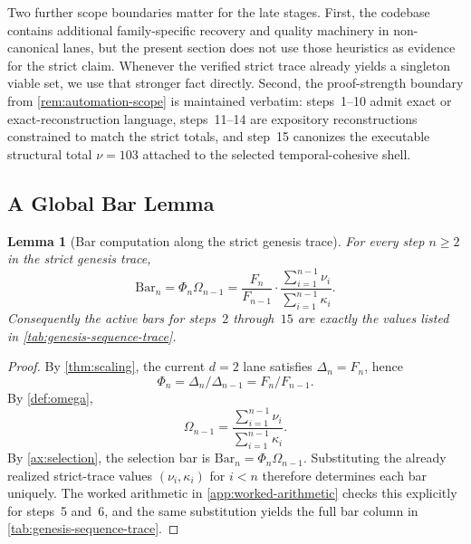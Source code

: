 \documentclass[11pt,a4paper]{article}
\theoremstyle{plain}
\newtheorem{lemma}[theorem]{Lemma}
\theoremstyle{definition}
\theoremstyle{remark}
\begin{document}
Two further scope boundaries matter for the late stages.
First, the codebase contains additional family-specific recovery and quality
machinery in non-canonical lanes, but the present section does not use those
heuristics as evidence for the strict claim.
Whenever the verified strict trace already yields a singleton viable set, we use
that stronger fact directly.
Second, the proof-strength boundary from \cref{rem:automation-scope} is
maintained verbatim:
steps~1--10 admit exact or exact-reconstruction language,
steps~11--14 are expository reconstructions constrained to match the strict
totals, and step~15 canonizes the executable structural total $\nu=103$
attached to the selected temporal-cohesive shell.

\subsection{A Global Bar Lemma}
\label{subsec:genesis-bar-lemma}

\begin{lemma}[Bar computation along the strict genesis trace]
\label{lem:genesis-bar-lemma}
For every step $n \ge 2$ in the strict genesis trace,
\[
  \mathrm{Bar}_n
  =
  \Phi_n \Omega_{n-1}
  =
  \frac{F_n}{F_{n-1}}
  \cdot
  \frac{\sum_{i=1}^{n-1}\nu_i}{\sum_{i=1}^{n-1}\kappa_i}.
\]
Consequently the active bars for steps~$2$ through~$15$ are exactly the values
listed in \cref{tab:genesis-sequence-trace}.
\end{lemma}

\begin{proof}
By \cref{thm:scaling}, the current $d=2$ lane satisfies $\Delta_n=F_n$, hence
\[
  \Phi_n = \Delta_n/\Delta_{n-1} = F_n/F_{n-1}.
\]
By \cref{def:omega},
\[
  \Omega_{n-1} = \frac{\sum_{i=1}^{n-1}\nu_i}{\sum_{i=1}^{n-1}\kappa_i}.
\]
By \cref{ax:selection}, the selection bar is
$\mathrm{Bar}_n = \Phi_n \Omega_{n-1}$.
Substituting the already realized strict-trace values
$(\nu_i,\kappa_i)$ for $i<n$ therefore determines each bar uniquely.
The worked arithmetic in \cref{app:worked-arithmetic} checks this explicitly for
steps~5 and~6, and the same substitution yields the full bar column in
\cref{tab:genesis-sequence-trace}.
\end{proof}
\end{document}
